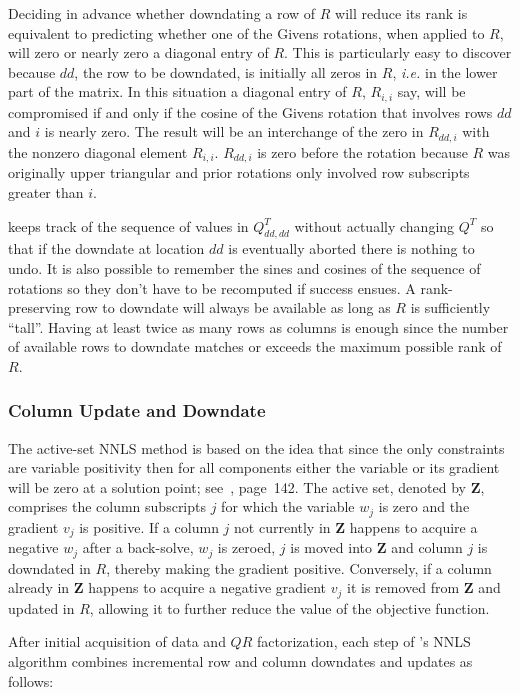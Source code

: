 Deciding in advance whether downdating a row of $R$ will reduce its rank
is equivalent to predicting whether one of the Givens rotations, when applied to $R$,
will zero or nearly zero a diagonal entry of $R$.
This is particularly easy to discover because $dd$, the row to be downdated, is initially all zeros in $R$,
\emph{i.e.} in the lower part of the matrix.
In this situation a diagonal entry of $R$, $R_{i,i}$ say, will be compromised if and only if the
cosine of the Givens rotation that involves rows $dd$ and $i$ is nearly zero.
The result will be an interchange of the zero in $R_{dd,i}$ with the nonzero diagonal element $R_{i,i}$.
$R_{dd,i}$ is zero before the rotation because
$R$ was originally upper triangular and prior rotations only involved row subscripts greater than $i$.

\pacora keeps track of the sequence of values in $Q^T_{dd,dd}$ without actually changing $Q^T$
so that if the downdate at location $dd$ is eventually aborted there is nothing to undo.
It is also possible to remember the sines and cosines of the sequence of rotations
so they don't have to be recomputed if success ensues.
A rank-preserving row to downdate will always be available as long as $R$ is sufficiently ``tall''.
Having at least twice as many rows as columns is enough since the number of available rows to downdate
matches or exceeds the maximum possible rank of $R$.

\subsubsection{Column Update and Downdate}

The active-set NNLS method is based on the idea that since the only constraints are variable positivity
then for all components either the variable or its gradient will be zero at a solution point; see~\cite{BoVa}, page~142.
The active set, denoted by \textbf{Z}, comprises the column subscripts $j$ for which the variable $w_j$ is zero and the gradient $v_j$ is positive. If a column $j$ not currently in \textbf{Z} happens to acquire a negative $w_j$ after a back-solve, $w_j$ is zeroed,
$j$ is moved into \textbf{Z} and column $j$ is downdated in $R$, thereby making the gradient positive.
Conversely, if a column already in \textbf{Z} happens to acquire a negative gradient $v_j$ it is removed from \textbf{Z} and updated in $R$,
allowing it to further reduce the value of the objective function.

After initial acquisition of data and $QR$ factorization, each step of \pacora's NNLS algorithm
combines incremental row and column downdates and updates as follows:

